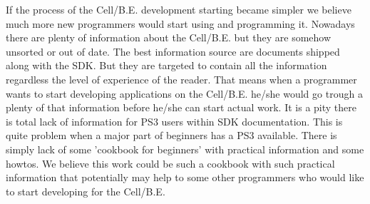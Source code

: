\par
If the process of the \mbox{Cell/B.E.} development starting became simpler we believe much more new programmers would start using and programming it.
Nowadays there are plenty of information about the \mbox{Cell/B.E.} but they are somehow unsorted or out of date.
The best information source are documents shipped along with the SDK.
But they are targeted to contain all the information regardless the level of experience of the reader.
That means when a programmer wants to start developing applications on the \mbox{Cell/B.E.} he/she would go trough a plenty of that information before he/she can start actual work.
It is a pity there is total lack of information for PS3 users within SDK documentation.
This is quite problem when a major part of beginners has a PS3 available.
There is simply lack of some 'cookbook for beginners' with practical information and some howtos.
We believe this work could be such a cookbook with such practical information that potentially may help to some other programmers who would like to start developing for the \mbox{Cell/B.E.}
